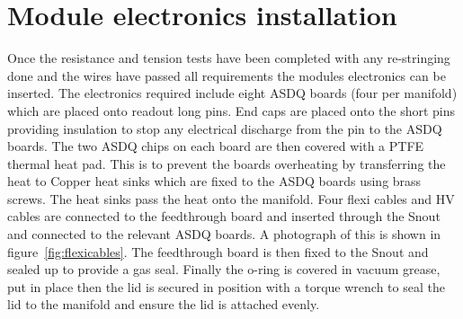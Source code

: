 \section{Module electronics installation}

Once the resistance and tension tests have been completed with any re-stringing done and the wires have passed all requirements the modules electronics can be inserted. The electronics required include eight ASDQ boards (four per manifold) which are placed onto readout long pins. End caps are placed onto the short pins providing insulation to stop any electrical discharge from the pin to the ASDQ boards. The two ASDQ chips on each board are then covered with a PTFE thermal heat pad. This is to prevent the boards overheating by transferring the heat to Copper heat sinks which are fixed to the ASDQ boards using brass screws. The heat sinks pass the heat onto the manifold. Four flexi cables and HV cables are connected to the feedthrough board and inserted through the Snout and connected to the relevant ASDQ boards. A photograph of this is shown in figure~\ref{fig:flexicables}. The feedthrough board is then fixed to the Snout and sealed up to provide a gas seal. Finally the o-ring is covered in vacuum grease, put in place then the lid is secured in position with a torque wrench to seal the lid to the manifold and ensure the lid is attached evenly.

